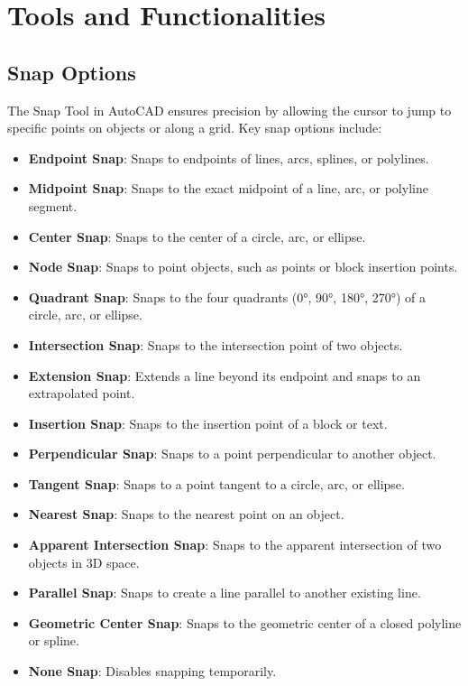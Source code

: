 \documentclass[12pt]{article}
\begin{document}
\section*{Tools and Functionalities}

\subsection*{Snap Options}
The Snap Tool in AutoCAD ensures precision by allowing the cursor to jump to specific points on objects or along a grid. Key snap options include:

\begin{itemize}
    \item \textbf{Endpoint Snap}: Snaps to endpoints of lines, arcs, splines, or polylines.
    \item \textbf{Midpoint Snap}: Snaps to the exact midpoint of a line, arc, or polyline segment.
    \item \textbf{Center Snap}: Snaps to the center of a circle, arc, or ellipse.
    \item \textbf{Node Snap}: Snaps to point objects, such as points or block insertion points.
    \item \textbf{Quadrant Snap}: Snaps to the four quadrants (0°, 90°, 180°, 270°) of a circle, arc, or ellipse.
    \item \textbf{Intersection Snap}: Snaps to the intersection point of two objects.
    \item \textbf{Extension Snap}: Extends a line beyond its endpoint and snaps to an extrapolated point.
    \item \textbf{Insertion Snap}: Snaps to the insertion point of a block or text.
    \item \textbf{Perpendicular Snap}: Snaps to a point perpendicular to another object.
    \item \textbf{Tangent Snap}: Snaps to a point tangent to a circle, arc, or ellipse.
    \item \textbf{Nearest Snap}: Snaps to the nearest point on an object.
    \item \textbf{Apparent Intersection Snap}: Snaps to the apparent intersection of two objects in 3D space.
    \item \textbf{Parallel Snap}: Snaps to create a line parallel to another existing line.
    \item \textbf{Geometric Center Snap}: Snaps to the geometric center of a closed polyline or spline.
    \item \textbf{None Snap}: Disables snapping temporarily.
\end{itemize}
\end{document}
